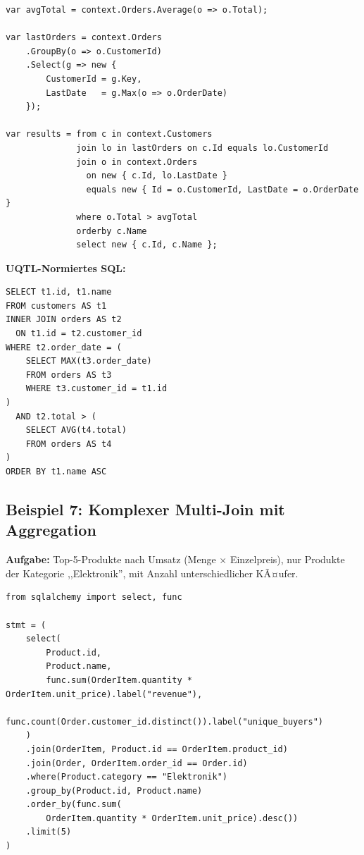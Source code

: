 \begin{lstlisting}[style=csharpstyle, caption={Beispiel 6 -- C\# (Subquery via LINQ)},
  label=lst:bsp6_cs]
var avgTotal = context.Orders.Average(o => o.Total);

var lastOrders = context.Orders
    .GroupBy(o => o.CustomerId)
    .Select(g => new {
        CustomerId = g.Key,
        LastDate   = g.Max(o => o.OrderDate)
    });

var results = from c in context.Customers
              join lo in lastOrders on c.Id equals lo.CustomerId
              join o in context.Orders
                on new { c.Id, lo.LastDate }
                equals new { Id = o.CustomerId, LastDate = o.OrderDate }
              where o.Total > avgTotal
              orderby c.Name
              select new { c.Id, c.Name };
\end{lstlisting}

\begin{successbox}
\textbf{UQTL-Normiertes SQL:}
\begin{lstlisting}[style=sqlstyle, numbers=none]
SELECT t1.id, t1.name
FROM customers AS t1
INNER JOIN orders AS t2
  ON t1.id = t2.customer_id
WHERE t2.order_date = (
    SELECT MAX(t3.order_date)
    FROM orders AS t3
    WHERE t3.customer_id = t1.id
)
  AND t2.total > (
    SELECT AVG(t4.total)
    FROM orders AS t4
)
ORDER BY t1.name ASC
\end{lstlisting}
\end{successbox}

\subsection{Beispiel 7: Komplexer Multi-Join mit Aggregation}
\label{subsec:bsp7}

\textbf{Aufgabe:} Top-5-Produkte nach Umsatz (Menge $\times$ Einzelpreis),
nur Produkte der Kategorie ,,Elektronik'', mit Anzahl unterschiedlicher KÃ¤ufer.

\begin{lstlisting}[style=pythonstyle, caption={Beispiel 7 -- Python (Multi-Join + Aggregation)},
  label=lst:bsp7_py]
from sqlalchemy import select, func

stmt = (
    select(
        Product.id,
        Product.name,
        func.sum(OrderItem.quantity * OrderItem.unit_price).label("revenue"),
        func.count(Order.customer_id.distinct()).label("unique_buyers")
    )
    .join(OrderItem, Product.id == OrderItem.product_id)
    .join(Order, OrderItem.order_id == Order.id)
    .where(Product.category == "Elektronik")
    .group_by(Product.id, Product.name)
    .order_by(func.sum(
        OrderItem.quantity * OrderItem.unit_price).desc())
    .limit(5)
)
\end{lstlisting}

